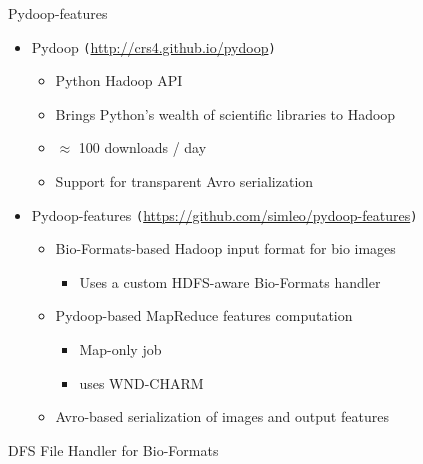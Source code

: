 \documentclass[compress]{beamer}
\newcommand{\urlref}[1]{{\small \texttt{(}{\color{blue}\url{#1}}\texttt{)}}}
\begin{document}
\begin{frame}{Pydoop-features}
  \begin{center}
    \begin{itemize}
    \item Pydoop \urlref{http://crs4.github.io/pydoop}
      \begin{itemize}
      \item Python Hadoop API
      \item Brings Python's wealth of scientific libraries to Hadoop
      \item $\approx$ 100 downloads / day
      \item Support for transparent Avro serialization
      \end{itemize}
    \item Pydoop-features \urlref{https://github.com/simleo/pydoop-features}
      \begin{itemize}
      \item Bio-Formats-based Hadoop input format for bio images
        \begin{itemize}
        \item Uses a custom HDFS-aware Bio-Formats handler
        \end{itemize}
      \item Pydoop-based MapReduce features computation
        \begin{itemize}
        \item Map-only job
        \item uses WND-CHARM
        \end{itemize}
      \item Avro-based serialization of images and output features

      \end{itemize}
    \end{itemize}
  \end{center}
\end{frame}

\begin{frame}{DFS File Handler for Bio-Formats}
  \begin{center}
  \end{center}
\end{frame}
\end{document}
